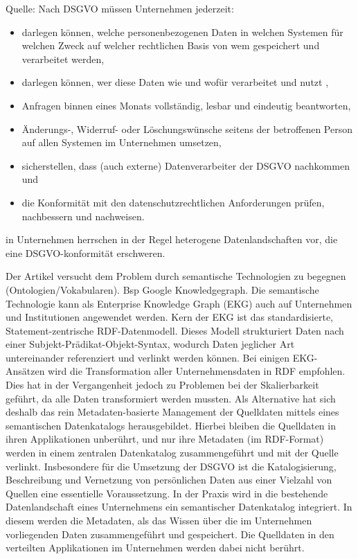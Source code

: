Quelle: \cite{Brockmann2018}
Nach DSGVO müssen Unternehmen jederzeit: 
\begin{itemize}
\item	darlegen können, welche personenbezogenen Daten in welchen
Systemen für welchen Zweck auf welcher rechtlichen Basis von
wem gespeichert und verarbeitet werden,\cite[Kapitel II Artikel 13]{union2016verordnung}
\item darlegen können, wer diese Daten wie und wofür verarbeitet
und nutzt \cite[Kapitel II Artikel 14]{union2016verordnung},
\item Anfragen binnen eines Monats vollständig, lesbar und eindeutig
beantworten\cite[Kapitel II Artikel 15]{union2016verordnung},
\item Änderungs-, Widerruf- oder Löschungswünsche seitens der
betroffenen Person auf allen Systemen im Unternehmen umsetzen\cite[Kapitel II Artikel 16,17,19,21]{union2016verordnung},
\item sicherstellen, dass (auch externe) Datenverarbeiter der DSGVO
nachkommen \cite[Kapitel II Artikel 28]{union2016verordnung} und
\item die Konformität mit den datenschutzrechtlichen Anforderungen
prüfen, nachbessern und nachweisen.

\end{itemize}

in Unternehmen herrschen in der Regel heterogene Datenlandschaften vor, die eine DSGVO-konformität erschweren.

Der Artikel versucht dem Problem durch semantische Technologien zu begegnen (Ontologien/Vokabularen). Bsp Google Knowledgegraph.
Die semantische Technologie kann als Enterprise Knowledge
Graph (EKG) auch auf Unternehmen und Institutionen angewendet
werden.
Kern der EKG ist das standardisierte, Statement-zentrische
RDF-Datenmodell. Dieses Modell strukturiert Daten nach einer
Subjekt-Prädikat-Objekt-Syntax, wodurch Daten jeglicher Art
untereinander referenziert und verlinkt werden können.
Bei einigen EKG-Ansätzen wird die Transformation aller Unternehmensdaten
in RDF empfohlen. Dies hat in der Vergangenheit
jedoch zu Problemen bei der Skalierbarkeit geführt, da alle
Daten transformiert werden mussten. Als Alternative hat sich
deshalb das rein Metadaten-basierte Management der Quelldaten
mittels eines semantischen Datenkatalogs herausgebildet. Hierbei
bleiben die Quelldaten in ihren Applikationen unberührt,
und nur ihre Metadaten (im RDF-Format) werden in einem zentralen
Datenkatalog zusammengeführt und mit der Quelle verlinkt.
Insbesondere für die Umsetzung der DSGVO ist die Katalogisierung,
Beschreibung und Vernetzung von persönlichen Daten
aus einer Vielzahl von Quellen eine essentielle Voraussetzung.
In der Praxis wird in die bestehende Datenlandschaft eines
Unternehmens ein semantischer Datenkatalog integriert. In diesem
werden die Metadaten, als das Wissen über die im Unternehmen
vorliegenden Daten zusammengeführt und gespeichert.
Die Quelldaten in den verteilten Applikationen im Unternehmen
werden dabei nicht berührt.


